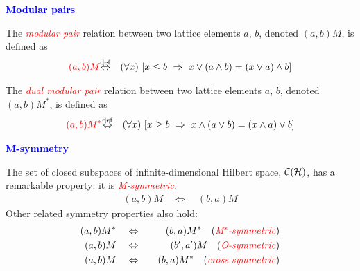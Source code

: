 \documentclass{slides}
\begin{document}
\begin{slide}

\begin{center}
\textcolor{blue}{\textbf{Modular pairs}}
\end{center}

The \textcolor{red}{\textit{modular pair}} relation between
two lattice elements $a$, $b$, denoted
 $(a,b)M$, is defined as
\begin{eqnarray}
\textcolor{red}{(a,b)M} & {\buildrel\rm def\over \Leftrightarrow}&
  (\forall x)\ [ x \le b \ \Rightarrow\  x \vee (a \wedge b) = (x \vee a) \wedge b]
 \label{mpdef}
\end{eqnarray}

The \textcolor{red}{\textit{dual modular pair}} relation between
two lattice elements $a$, $b$, denoted
 $(a,b)M^*$, is defined as
\begin{eqnarray}
\textcolor{red}{(a,b)M^*} & {\buildrel\rm def\over \Leftrightarrow}&
  (\forall x)\ [ x \ge b \ \Rightarrow\  x \wedge (a \vee b) = (x \wedge a) \vee b]
\label{dmpdef}
\end{eqnarray}

\end{slide}
\begin{slide}

\begin{center}
\textcolor{blue}{\textbf{M-symmetry}}
\end{center}

The set of closed subspaces of infinite-dimensional Hilbert space, ${\cal C}({\cal H})$,
has a remarkable property:  it is \textcolor{red}{\textit{M-symmetric}}.
\begin{eqnarray}
  (a,b)M \quad\Leftrightarrow\quad (b,a)M
\end{eqnarray}
Other related symmetry properties also hold:
\begin{eqnarray}
  (a,b)M^* &\quad\Leftrightarrow\quad& (b,a)M^* \quad\mbox{(\textcolor{red}{\textit{M${}^*$-symmetric}})}\\
  (a,b)M &\quad\Leftrightarrow\quad& (b',a')M \quad\mbox{(\textcolor{red}{\textit{O-symmetric}})}\\
  (a,b)M &\quad\Leftrightarrow\quad& (b,a)M^* \quad\mbox{(\textcolor{red}{\textit{cross-symmetric}})}
\end{eqnarray}

\end{slide}
\end{document}
